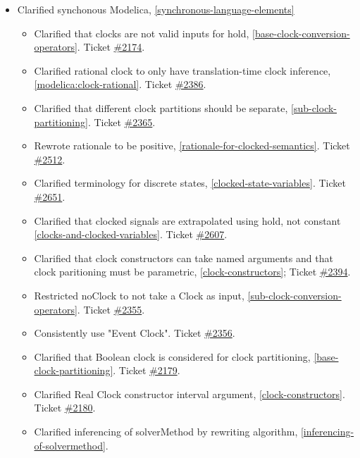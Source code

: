 \begin{itemize}
\item Clarified synchonous Modelica, \cref{synchronous-language-elements}
\begin{itemize}
\item Clarified that clocks are not valid inputs for hold, \cref{base-clock-conversion-operators}.
Ticket \href{https://github.com/modelica/ModelicaSpecification/issues/2174}{\#2174}.
\item Clarified rational clock to only have translation-time clock inference, \cref{modelica:clock-rational}.
Ticket \href{https://github.com/modelica/ModelicaSpecification/issues/2386}{\#2386}.
\item Clarified that different clock partitions should be separate, \cref{sub-clock-partitioning}.
Ticket \href{https://github.com/modelica/ModelicaSpecification/issues/2365}{\#2365}.
\item Rewrote rationale to be positive, \cref{rationale-for-clocked-semantics}.
Ticket \href{https://github.com/modelica/ModelicaSpecification/issues/2512}{\#2512}.
\item Clarified terminology for discrete states, \cref{clocked-state-variables}.
Ticket \href{https://github.com/modelica/ModelicaSpecification/issues/2651}{\#2651}.
\item Clarified that clocked signals are extrapolated using hold, not constant \cref{clocks-and-clocked-variables}.
Ticket \href{https://github.com/modelica/ModelicaSpecification/pull/2607}{\#2607}.
\item Clarified that clock constructors can take named arguments and that clock paritioning must be parametric, \cref{clock-constructors};
Ticket \href{https://github.com/modelica/ModelicaSpecification/pull/2394}{\#2394}.
\item Restricted noClock to not take a Clock as input, \cref{sub-clock-conversion-operators}.
Ticket \href{https://github.com/modelica/ModelicaSpecification/issues/2355}{\#2355}.
\item Consistently use "Event Clock".
Ticket \href{https://github.com/modelica/ModelicaSpecification/issues/2356}{\#2356}.
\item Clarified that Boolean clock is considered for clock partitioning, \cref{base-clock-partitioning}.
Ticket \href{https://github.com/modelica/ModelicaSpecification/issues/2179}{\#2179}.
\item Clarified Real Clock constructor interval argument, \cref{clock-constructors}.
Ticket \href{https://github.com/modelica/ModelicaSpecification/issues/2180}{\#2180}.
\item Clarified inferencing of solverMethod by rewriting algorithm, \cref{inferencing-of-solvermethod}.

\end{itemize}
\end{itemize}
